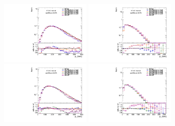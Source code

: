 \begin{figure}[htbp!]
\begin{center}
\includegraphics[angle=270, width=0.4\textwidth]{./figures/boosted/Prereweight/2bs_directcompare_leadHCand_trk0_Pt_1.pdf}
\includegraphics[angle=270, width=0.4\textwidth]{./figures/boosted/Prereweight/2bs_directcompare_leadHCand_trk1_Pt_1.pdf}\\
\includegraphics[angle=270, width=0.4\textwidth]{./figures/boosted/Prereweight/2bs_directcompare_sublHCand_trk0_Pt_1.pdf}
\includegraphics[angle=270, width=0.4\textwidth]{./figures/boosted/Prereweight/2bs_directcompare_sublHCand_trk1_Pt_1.pdf}\\

\end{center}
\end{figure}
